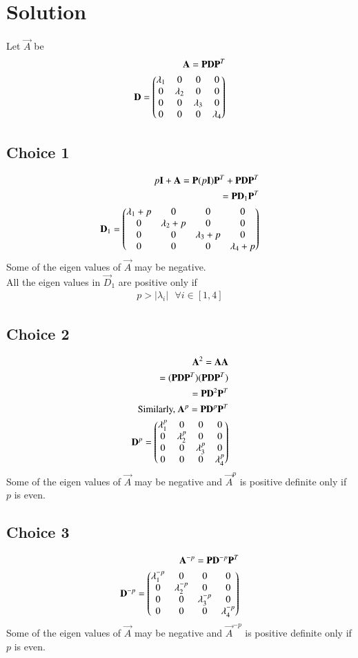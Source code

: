 \documentclass[journal,12pt,twocolumn]{IEEEtran}
\begin{document}
\section{Solution}
Let $\vec{A}$ be
\begin{align}
    \mathbf{A}=\mathbf{P}\mathbf{D}\mathbf{P}^T\\
    \mathbf{D}=\begin{pmatrix}\lambda_1&0&0&0\\0&\lambda_2&0&0\\0&0&\lambda_3&0\\0&0&0&\lambda_4\end{pmatrix}
\end{align}
\subsection{Choice 1}
\begin{align}
    p\mathbf{I}+\mathbf{A}=\mathbf{P}(p\mathbf{I})\mathbf{P}^T+\mathbf{P}\mathbf{D}\mathbf{P}^T\\
   = \mathbf{P}\mathbf{D}_1\mathbf{P}^T\\
    \mathbf{D}_1=\begin{pmatrix}\lambda_1+p&0&0&0\\0&\lambda_2+p&0&0\\0&0&\lambda_3+p&0\\0&0&0&\lambda_4+p\end{pmatrix}
\end{align}
Some of the eigen values of $\vec{A}$ may be negative.\\
All the eigen values in $\vec{D}_1$ are positive only if 
\begin{align}
    p>|\lambda_i|\text{  } \forall i \in [1,4]
\end{align}
\subsection{Choice 2}
\begin{align}
    \mathbf{A}^2=\mathbf{A}\mathbf{A}\\
    =(\mathbf{P}\mathbf{D}\mathbf{P}^T)(\mathbf{P}\mathbf{D}\mathbf{P}^T)\\
    =\mathbf{P}\mathbf{D}^2\mathbf{P}^T\\
    \text{Similarly, }\mathbf{A}^p=\mathbf{P}\mathbf{D}^p\mathbf{P}^T\\
    \mathbf{D}^p=\begin{pmatrix}\lambda_1^p&0&0&0\\0&\lambda_2^p&0&0\\0&0&\lambda_3^p&0\\0&0&0&\lambda_4^p\end{pmatrix}
\end{align}
Some of the eigen values of $\vec{A}$ may be negative and $\vec{A}^p$ is positive definite only if $p$ is even.
\subsection{Choice 3}
\begin{align}
    \mathbf{A}^{-p}=\mathbf{P}\mathbf{D}^{-p}\mathbf{P}^T\\
    \mathbf{D}^{-p}=\begin{pmatrix}\lambda_1^{-p}&0&0&0\\0&\lambda_2^{-p}&0&0\\0&0&\lambda_3^{-p}&0\\0&0&0&\lambda_4^{-p}\end{pmatrix}
\end{align}
Some of the eigen values of $\vec{A}$ may be negative and $\vec{A}^{-p}$ is positive definite only if $p$ is even.
\end{document}
